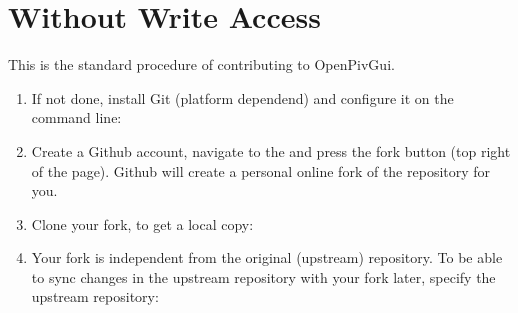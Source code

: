 \documentclass[letterpaper,10pt,english]{sphinxmanual}
\begin{document}
\section{Without Write Access}
\label{\detokenize{contribution:without-write-access}}
This is the standard procedure of contributing to OpenPivGui.
\begin{enumerate}
%
\item {} 
If not done, install Git (platform dependend) and configure it on the command line:

\begin{sphinxVerbatim}[commandchars=\\\{\}]
    
    
\end{sphinxVerbatim}

\item {} 
Create a Github account, navigate to the  and press the fork button (top right of the page). Github will create a personal online fork of the repository for you.

\item {} 
Clone your fork, to get a local copy:

\begin{sphinxVerbatim}[commandchars=\\\{\}]
  
\end{sphinxVerbatim}

\item {} 
Your fork is independent from the original (upstream) repository. To be able to sync changes in the upstream repository with your fork later, specify the upstream repository:

\begin{sphinxVerbatim}[commandchars=\\\{\}]
 
    
  
\end{sphinxVerbatim}


\end{enumerate}
\end{document}
